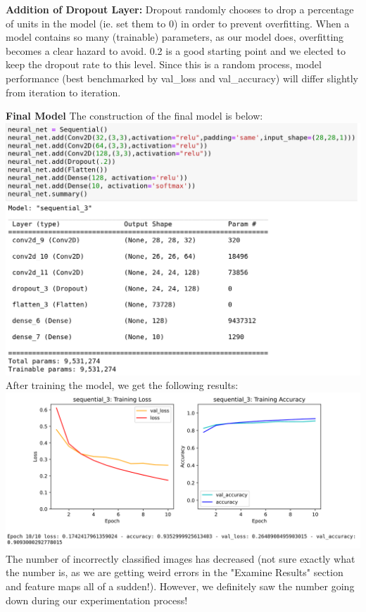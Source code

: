 \documentclass[11pt]{article}
\begin{document}
\begin{center}
{\bf Addition of Dropout Layer:}
Dropout randomly chooses to drop a percentage of units in the model (ie. set them to 0) in order to prevent overfitting. When a model contains so many (trainable)
parameters, as our model does, overfitting becomes a clear hazard to avoid. 0.2 is a good starting point and we elected to keep the dropout rate to this level.
Since this is a random process, model performance (best benchmarked by val\_loss and val\_accuracy) will differ slightly from iteration to iteration.

{\bf Final Model}
\linebreak
The construction of the final model is below:
\includegraphics[scale=0.25]{Final_dropout_construct}
\linebreak
After training the model, we get the following results:
\includegraphics[scale=0.25]{Final_dropout_train}
\linebreak
The number of incorrectly classified images has decreased (not sure exactly what the number is, as we are getting weird errors in the "Examine Results" section and feature maps
all of a sudden!). However, we definitely saw the number going down during our experimentation process!


\end{center}
\end{document}

